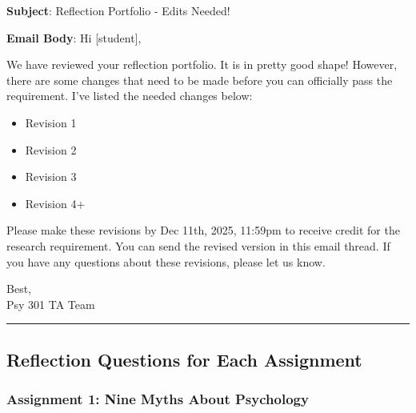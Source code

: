 \documentclass[
]{article}
\providecommand{\tightlist}{%
  \setlength{\itemsep}{0pt}\setlength{\parskip}{0pt}}
\begin{document}
\textbf{Subject}: Reflection Portfolio - Edits Needed!

\textbf{Email Body}:
Hi {[}student{]},

We have reviewed your reflection portfolio. It is in pretty good shape! However, there are some changes that need to be made before you can officially pass the requirement. I've listed the needed changes below:

\begin{itemize}
\tightlist
\item
  Revision 1\\
\item
  Revision 2\\
\item
  Revision 3\\
\item
  Revision 4+
\end{itemize}

Please make these revisions by Dec 11th, 2025, 11:59pm to receive credit for the research requirement. You can send the revised version in this email thread. If you have any questions about these revisions, please let us know.

Best,\\
Psy 301 TA Team

\begin{center}\rule{0.5\linewidth}{0.5pt}\end{center}

\hypertarget{reflection-questions-for-each-assignment}{%
\subsection{Reflection Questions for Each Assignment}\label{reflection-questions-for-each-assignment}}

\hypertarget{assignment-1-nine-myths-about-psychology}{%
\subsubsection{Assignment 1: Nine Myths About Psychology}\label{assignment-1-nine-myths-about-psychology}}
\end{document}
